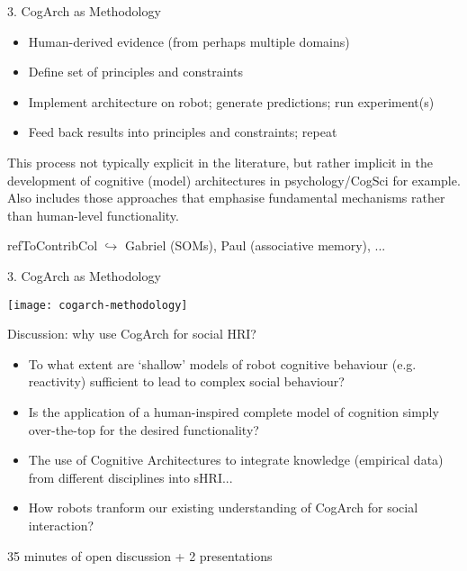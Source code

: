 \documentclass[compress]{beamer}
\newcommand{\refToContrib}[1]{%
    \begin{beamercolorbox}[wd=\linewidth,ht=2ex,dp=0.7ex]{refToContribCol}%
    \hspace{0.5em}$\hookrightarrow$ #1%
    \end{beamercolorbox}%
}%
\begin{document}
\begin{frame}{3. CogArch as Methodology}    

    \begin{itemize}
        \item Human-derived evidence (from perhaps multiple domains)
        \item Define set of principles and constraints
        \item Implement architecture on robot; generate predictions; run experiment(s)
        \item Feed back results into principles and constraints; repeat
    \end{itemize}
    
    This process not typically explicit in the literature, but rather implicit in the development of cognitive (model) architectures in psychology/CogSci for example. Also includes those approaches that emphasise fundamental mechanisms rather than human-level functionality.    
    \refToContrib{Gabriel (SOMs), Paul (associative memory), ...}
    
\end{frame}


\begin{frame}{3. CogArch as Methodology}    

    \texttt{[image: cogarch-methodology]}

\end{frame}




\begin{frame}{Discussion: why use CogArch for social HRI?}
    

    \begin{itemize}
        \item To what extent are `shallow' models of robot cognitive behaviour (e.g. reactivity) sufficient to lead to complex social behaviour?

        \item Is the application of a human-inspired complete model of cognition simply over-the-top for the desired functionality?
        \item The use of Cognitive Architectures to integrate knowledge (empirical data) from different disciplines into sHRI...
        \item How robots tranform our existing understanding of CogArch for
            social interaction?
    \end{itemize}
    
	\vspace{0.5cm}	

    35 minutes of open discussion + 2 presentations

\end{frame}
\end{document}
